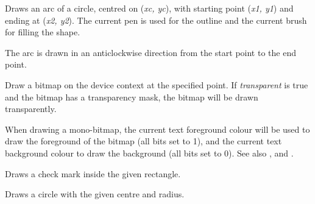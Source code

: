 \label{wxdcdrawarc}


Draws an arc of a circle, centred on ({\it xc, yc}), with starting point ({\it x1, y1})
and ending at ({\it x2, y2}).   The current pen is used for the outline
and the current brush for filling the shape.

The arc is drawn in an anticlockwise direction from the start point to the end point.


\label{wxdcdrawbitmap}


Draw a bitmap on the device context at the specified point. If {\it transparent} is true and the bitmap has
a transparency mask, the bitmap will be drawn transparently.

When drawing a mono-bitmap, the current text foreground colour will be used to draw the foreground
of the bitmap (all bits set to 1), and the current text background colour to draw the background
(all bits set to 0). See also , 
 and .


\label{wxdcdrawcheckmark}



Draws a check mark inside the given rectangle.


\label{wxdcdrawcircle}



Draws a circle with the given centre and radius.




\label{wxdcdrawellipse}

